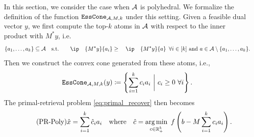 In this section, we consider the case when $\mathcal{A}$ is polyhedral. We formalize the definition of the function $\texttt{EssCone}_{\mathcal{A}, M, k}$ under this setting. Given a feasible dual vector $y$, we first compute the top-$k$ atoms in $\mathcal{A}$ with respect to the inner product with $M^*y$, i.e. 
\begin{equation} \label{eq:top-k}
    \{a_1, \dots, a_k\} \subseteq \Ascr \text{s.t.} \ip{M^*y}{a_i} \geq \ip{M^*y}{a} \enspace\forall i \in [k] ~\mbox{and}~ a \in \Ascr\setminus\{a_1, \dots, a_k\}.
\end{equation}
Then we construct the convex cone generated from these atoms, i.e., 
\[\texttt{EssCone}_{\mathcal{A}, M, k}(y) \coloneqq \left\{\sum_{i=1}^k c_i a_i ~\bigg\vert~ c_i \geq 0 ~\forall i\right\}.\]
The primal-retrieval problem \eqref{eq:primal_recover} then becomes
\begin{equation} \label{eq:primal_recover_polyhedral} \tag{PR-Poly}
\hat x = \sum_{i=1}^k \hat c_ia_i \hbox{\quad where\quad} \hat c = \underset{c \in \mathbb{R}^k_+}{\textrm{arg}\,{\min}}\enskip f\left( b - M\sum_{i=1}^k c_ia_i \right). 
\end{equation}


